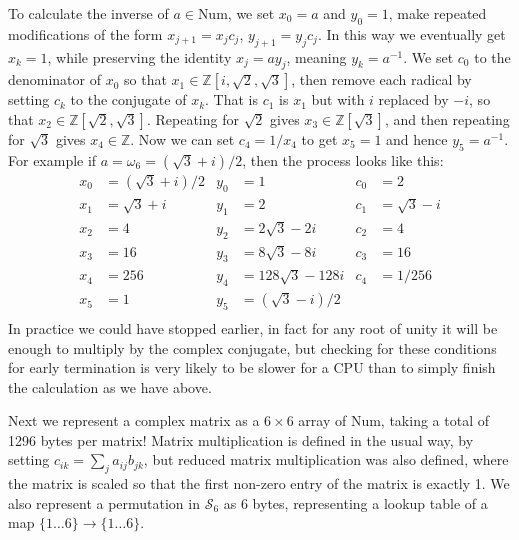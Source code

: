 To calculate the inverse of $a \in \text{Num}$, we set $x_0 = a$ and $y_0 = 1$, make repeated modifications of the form $x_{j+1} = x_jc_j$, $y_{j+1} = y_jc_j$. In this way we eventually get $x_k = 1$, while preserving the identity $x_j = ay_j$, meaning $y_k = a^{-1}$. We set $c_0$ to the denominator of $x_0$ so that $x_1 \in \mathbb{Z}[i, \sqrt{2}, \sqrt{3}]$, then remove each radical by setting $c_k$ to the conjugate of $x_k$. That is $c_1$ is $x_1$ but with $i$ replaced by $-i$, so that $x_2 \in \mathbb{Z}[\sqrt{2}, \sqrt{3}]$. Repeating for $\sqrt{2}$ gives $x_3 \in \mathbb{Z}[\sqrt{3}]$, and then repeating for $\sqrt{3}$ gives $x_4 \in \mathbb{Z}$. Now we can set $c_4 = 1/x_4$ to get $x_5 = 1$ and hence $y_5 = a^{-1}$. For example if $a = \omega_{6} = (\sqrt{3} + i)/2$, then the process looks like this:
\begin{align*}
	x_0 &= (\sqrt{3} + i)/2 & y_0 &= 1 & c_0 &= 2 \\
	x_1 &= \sqrt{3} + i & y_1 &= 2 & c_1 &= \sqrt{3}-i \\
	x_2 &= 4 & y_2 &= 2\sqrt{3}-2i & c_2 &= 4 \\
	x_3 &= 16 & y_3 &= 8\sqrt{3}-8i & c_3 &= 16 \\
	x_4 &= 256 & y_4 &= 128\sqrt{3}-128i & c_4 &= 1/256 \\
	x_5 &= 1 & y_5 &= (\sqrt{3}-i)/2 & \\
\end{align*}
In practice we could have stopped earlier, in fact for any root of unity it will be enough to multiply by the complex conjugate, but checking for these conditions for early termination is very likely to be slower for a CPU than to simply finish the calculation as we have above.

Next we represent a complex matrix as a $6\times 6$ array of Num, taking a total of 1296 bytes per matrix! Matrix multiplication is defined in the usual way, by setting $c_{ik} = \sum_j a_{ij}b_{jk}$, but reduced matrix multiplication was also defined, where the matrix is scaled so that the first non-zero entry of the matrix is exactly 1. We also represent a permutation in $\mathcal{S}_6$ as 6 bytes, representing a lookup table of a map $\{1\dots 6\} \to \{1 \dots 6\}$.


